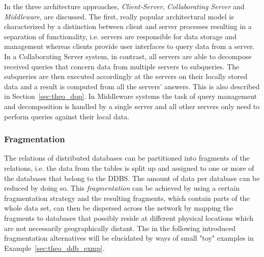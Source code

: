 In \citet[p.~608f.]{Ramakrish2000} the three architecture approaches, \emph{Client-Server}, \emph{Collaborating Server} and \emph{Middleware}, are 
discussed. The first, really popular architectural model is characterized by a distinction between client and server processes resulting in a separation of
functionality, i.e. servers are responsible for data storage and management whereas clients provide user interfaces to query data from a server. In a
Collaborating Server system, in contrast, all servers are able to decompose received queries that concern data from multiple servers to subqueries. The
subqueries are then executed accordingly at the servers on their locally stored data and a result is computed from all the servers' answers. This is also
described in Section~\ref{sec:theo_dqp}. In Middleware systems the task of query management and decomposition is handled by a single server and all other
servers only need to perform queries against their local data.



\subsubsection{Fragmentation}
\label{sec:theo_ddb_frag}
The relations of distributed databases can be partitioned into fragments of the relations, i.e. the data from the tables is split up and assigned to one 
or more of the databases that belong to the DDBS. The amount of data per database can be reduced by doing so. This \emph{fragmentation} can be achieved 
by using a certain fragmentation strategy and the resulting fragments, which contain parts of the whole data set, can then be dispersed across the network
by mapping the fragments to databases that possibly reside at different physical locations which are not necessarily geographically distant. The in the
following introduced fragmentation alternatives will be elucidated by ways of small "toy" examples in Example~\ref{sec:theo_ddb_exmp}.

